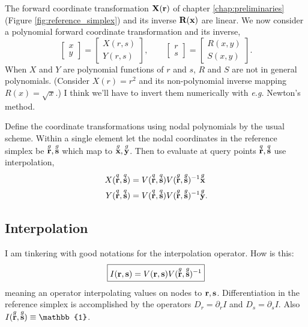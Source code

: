 The forward coordinate transformation $\textbf{X}(\textbf{r})$ of chapter \ref{chap:preliminaries} (Figure \ref{fig:reference_simplex}) and its inverse $\textbf{R}(\textbf{x})$ are linear.  We now consider a polynomial forward coordinate transformation and its inverse,
%
\begin{equation}
\begin{bmatrix}
x \\ y
\end{bmatrix}
=
\begin{bmatrix}
X(r, s) \\ Y(r,s)
\end{bmatrix},
\qquad
\begin{bmatrix}
r \\ s
\end{bmatrix}
=
\begin{bmatrix}
R(x, y) \\ S(x,y)
\end{bmatrix}.
\end{equation}
%
When $X$ and $Y$ are polynomial functions of $r$ and $s$, $R$ and $S$ are not in general polynomials.  (Consider $X(r) = r^2$ and its non-polynomial inverse mapping $R(x) = \sqrt{x}$.)  I think we'll have to invert them numerically with \emph{e.g.} Newton's method.

Define the coordinate transformations using nodal polynomials by the usual scheme.  Within a single element let the nodal coordinates in the reference simplex be $\overset{g}{\textbf{r}}, \overset{g}{\textbf{s}}$ which map to $\overset{g}{\textbf{x}}, \overset{g}{\textbf{y}}$.  Then to evaluate at query points $\overset{q}{\textbf{r}}, \overset{q}{\textbf{s}}$ use interpolation,
%
\begin{equation}
\begin{aligned}
X(\overset{q}{\textbf{r}}, \overset{q}{\textbf{s}}) &= V(\overset{q}{\textbf{r}}, \overset{q}{\textbf{s}}) V(\overset{g}{\textbf{r}}, \overset{g}{\textbf{s}})^{-1} \overset{g}{\textbf{x}} \\
Y(\overset{q}{\textbf{r}}, \overset{q}{\textbf{s}}) &= V(\overset{q}{\textbf{r}}, \overset{q}{\textbf{s}}) V(\overset{g}{\textbf{r}}, \overset{g}{\textbf{s}})^{-1} \overset{g}{\textbf{y}}.
\end{aligned}
\end{equation}

\subsection{Interpolation}

I am tinkering with good notations for the interpolation operator.  How is this:
%
\begin{equation}
\boxed{
I(\ve r, \ve s) = V(\ve r, \ve s) V(\g{\ve r}, \g{\ve s})^{-1}
}%
\end{equation}
%
meaning an operator interpolating values on nodes to $\textbf{r}, \textbf{s}$.  Differentiation in the reference simplex is accomplished by the operators $D_r = \partial_r I$ and $D_s = \partial_s I$.  Also $I(\g{\ve r}, \g{\ve s}) \equiv \mathbb{1}$.

